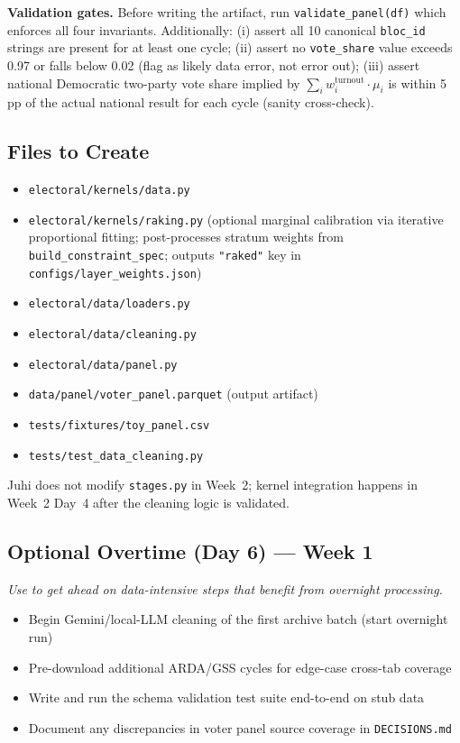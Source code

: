 \documentclass[11pt]{article}
\begin{document}
\textbf{Validation gates.}
Before writing the artifact, run \texttt{validate\_panel(df)} which enforces
all four invariants. Additionally: (i) assert all 10 canonical \texttt{bloc\_id}
strings are present for at least one cycle; (ii) assert no \texttt{vote\_share}
value exceeds 0.97 or falls below 0.02 (flag as likely data error, not error
out); (iii) assert national Democratic two-party vote share implied by
$\sum_i w_i^{\text{turnout}} \cdot \mu_i$ is within 5 pp of the actual
national result for each cycle (sanity cross-check).

\subsection*{Files to Create}

\begin{itemize}[leftmargin=1.6em, itemsep=2pt]
  \item \texttt{electoral/kernels/data.py}
  \item \texttt{electoral/kernels/raking.py} (optional marginal calibration via
        iterative proportional fitting; post-processes stratum weights from
        \texttt{build\_constraint\_spec}; outputs \texttt{"raked"} key in
        \texttt{configs/layer\_weights.json})
  \item \texttt{electoral/data/loaders.py}
  \item \texttt{electoral/data/cleaning.py}
  \item \texttt{electoral/data/panel.py}
  \item \texttt{data/panel/voter\_panel.parquet} (output artifact)
  \item \texttt{tests/fixtures/toy\_panel.csv}
  \item \texttt{tests/test\_data\_cleaning.py}
\end{itemize}

Juhi does not modify \texttt{stages.py} in Week~2; kernel integration happens in
Week~2 Day~4 after the cleaning logic is validated.

\subsection*{Optional Overtime (Day 6) --- Week 1}
\textit{Use to get ahead on data-intensive steps that benefit from overnight processing.}
\begin{itemize}[leftmargin=1.6em, itemsep=2pt]
  \item Begin Gemini/local-LLM cleaning of the first archive batch (start overnight run)
  \item Pre-download additional ARDA/GSS cycles for edge-case cross-tab coverage
  \item Write and run the schema validation test suite end-to-end on stub data
  \item Document any discrepancies in voter panel source coverage in \texttt{DECISIONS.md}
\end{itemize}
\end{document}
